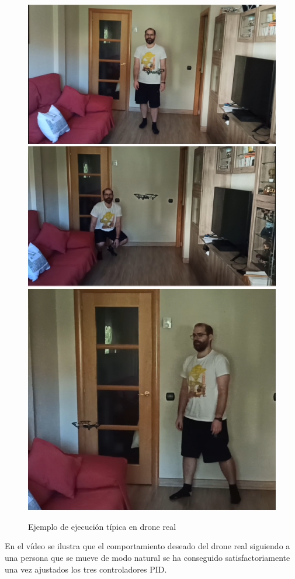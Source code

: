 \begin{figure}[!htb]
    \includegraphics[width=\linewidth]{figures/real/comR_1.png}
\endminipage\hfill
{}
    \includegraphics[width=\linewidth]{figures/real/comR_3.png}
\endminipage\hfill
\centering
\includegraphics[width=0.45\linewidth]{figures/real/comR_2.png}\hfill
\caption{Ejemplo de ejecución típica en drone real}
\label{fig:real_com}
\end{figure}

En el vídeo se ilustra que el comportamiento deseado del drone real siguiendo a una persona que se mueve de modo natural se ha conseguido satisfactoriamente una vez ajustados los tres controladores PID.